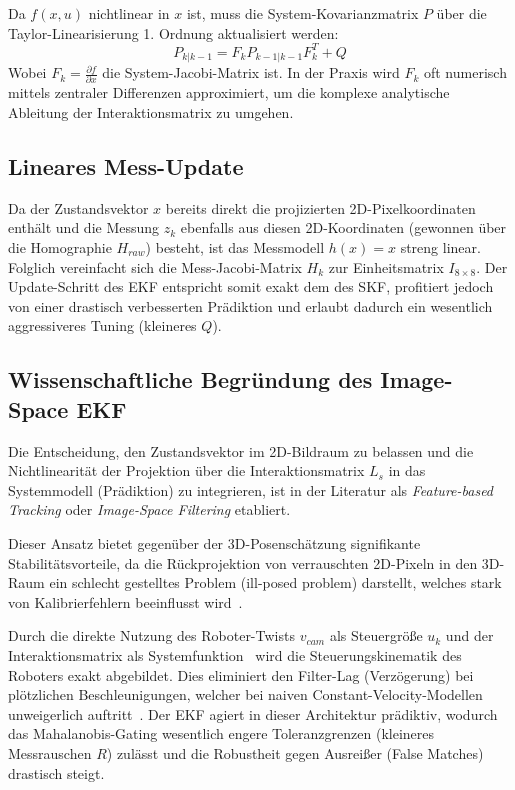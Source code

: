 \documentclass{article}
\begin{document}
Da $f(x,u)$ nichtlinear in $x$ ist, muss die System-Kovarianzmatrix $P$ über die Taylor-Linearisierung 1. Ordnung aktualisiert werden:
\begin{equation}
    P_{k|k-1} = F_k P_{k-1|k-1} F_k^T + Q
\end{equation}
Wobei $F_k = \frac{\partial f}{\partial x}$ die System-Jacobi-Matrix ist. In der Praxis wird $F_k$ oft numerisch mittels zentraler Differenzen approximiert, um die komplexe analytische Ableitung der Interaktionsmatrix zu umgehen.




\subsection{Lineares Mess-Update}
Da der Zustandsvektor $x$ bereits direkt die projizierten 2D-Pixelkoordinaten enthält und die Messung $z_k$ ebenfalls aus diesen 2D-Koordinaten (gewonnen über die Homographie $H_{raw}$) besteht, ist das Messmodell $h(x) = x$ streng linear.
Folglich vereinfacht sich die Mess-Jacobi-Matrix $H_k$ zur Einheitsmatrix $I_{8 \times 8}$. Der Update-Schritt des EKF entspricht somit exakt dem des SKF, profitiert jedoch von einer drastisch verbesserten Prädiktion und erlaubt dadurch ein wesentlich aggressiveres Tuning (kleineres $Q$).




\subsection{Wissenschaftliche Begründung des Image-Space EKF}
Die Entscheidung, den Zustandsvektor im 2D-Bildraum zu belassen und die Nichtlinearität der Projektion über die Interaktionsmatrix $L_s$ in das Systemmodell (Prädiktion) zu integrieren, ist in der Literatur als \textit{Feature-based Tracking} oder \textit{Image-Space Filtering} etabliert. 

Dieser Ansatz bietet gegenüber der 3D-Posenschätzung signifikante Stabilitätsvorteile, da die Rückprojektion von verrauschten 2D-Pixeln in den 3D-Raum ein schlecht gestelltes Problem (ill-posed problem) darstellt, welches stark von Kalibrierfehlern beeinflusst wird~\cite{comport2006real}. 

Durch die direkte Nutzung des Roboter-Twists $v_{cam}$ als Steuergröße $u_k$ und der Interaktionsmatrix als Systemfunktion~\cite{chaumette2006visual} wird die Steuerungskinematik des Roboters exakt abgebildet. Dies eliminiert den Filter-Lag (Verzögerung) bei plötzlichen Beschleunigungen, welcher bei naiven Constant-Velocity-Modellen unweigerlich auftritt~\cite{corke1996dynamic}. Der EKF agiert in dieser Architektur prädiktiv, wodurch das Mahalanobis-Gating wesentlich engere Toleranzgrenzen (kleineres Messrauschen $R$) zulässt und die Robustheit gegen Ausreißer (False Matches) drastisch steigt.
\end{document}
